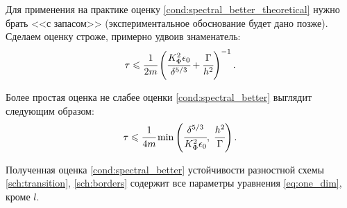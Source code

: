 Для применения на практике оценку \eqref{cond:spectral_better_theoretical} нужно брать <<с запасом>> (экспериментальное обоснование будет дано позже). Сделаем оценку строже, примерно удвоив знаменатель:
\begin{equation}
	\tau \leqslant \cfrac{1}{2m} \left( \cfrac{K_\Phi^2 \epsilon_0}{\delta^{5 / 3}} + \cfrac{\Gamma}{h^2} \right)^{-1} {\text{.}}
	\label{cond:spectral_better}
\end{equation}

Более простая оценка не слабее оценки \eqref{cond:spectral_better} выглядит следующим образом:
\begin{equation}
	\tau \leqslant \cfrac{1}{4m} \min \left(\cfrac{\delta^{5 / 3}}{K_\Phi^2 \epsilon_0}, \; \cfrac{h^2}{\Gamma} \right) {\text{.}}
	\label{cond:spectral_better_simpler}
\end{equation}

Полученная оценка \eqref{cond:spectral_better} устойчивости разностной схемы \eqref{sch:transition}, \eqref{sch:borders} содержит все параметры уравнения \eqref{eq:one_dim}, кроме $l$.